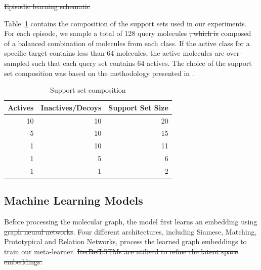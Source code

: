 \documentclass[journal=jcisd8,manuscript=article]{achemso} %
\providecommand{\DIFadd}[1]{{\protect\color{blue}\uwave{#1}}} %
\providecommand{\DIFdel}[1]{{\protect\color{red}\sout{#1}}}                      %
\providecommand{\DIFaddbegin}{} %
\providecommand{\DIFaddend}{} %
\providecommand{\DIFdelbegin}{} %
\providecommand{\DIFdelend}{} %
\providecommand{\DIFdelFL}[1]{\DIFdel{#1}} %
\begin{document}
\DIFdelbegin %
{%
\DIFdelFL{Episodic learning schematic}}

\DIFdelend Table~\ref{table:support-set-sizes} contains the composition of the support sets used in our experiments. For each episode, we sample a total of 128 query molecules \DIFdelbegin \DIFdel{, which is }\DIFdelend composed of a balanced combination of molecules from each class. If the active class for a specific target contains less than 64 molecules, the active molecules are over-sampled such that each query set contains 64 actives. The choice of the support set composition was based on the methodology presented in \citet{altae2017low}.

\begin{table}
    \centering
    \begin{tabular}{@{}rrr@{}}
        \hline
        Actives & Inactives/Decoys & Support Set Size \\
        \hline
        10  & 10 & 20 \\
        5   & 10 & 15 \\
        1   & 10 & 11 \\
        1   & 5  & 6 \\
        1   & 1  & 2 \\
        \hline
    \end{tabular}
    \caption{Support set composition}
    \label{table:support-set-sizes}
\end{table}

\subsection{Machine Learning Models}

Before processing the molecular graph, the model first learns an embedding using \DIFdelbegin \DIFdel{graph neural networks}\DIFdelend \DIFaddbegin \DIFadd{GCNs}\DIFaddend . Four different architectures, including Siamese, Matching, Prototypical and Relation Networks, \DIFaddbegin \DIFadd{subsequently }\DIFaddend process the learned graph embeddings to train our meta-learner.
\DIFdelbegin \DIFdel{IterRefLSTMs are utilised to refine the latent space embeddings. 
}\DIFdelend 
\end{document}
